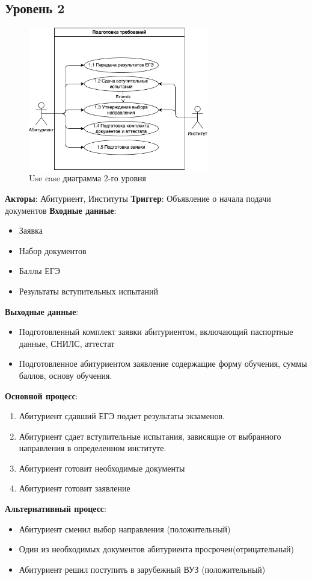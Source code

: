 \documentclass[areasetadvanced]{scrartcl}
\begin{document}
\subsection{Уровень 2}
\begin{figure}[H]
    \centering
    \includegraphics[width=0.7\textwidth]{images/UseCase_2.drawio.png}
    \caption{Use case диаграмма 2-го уровня}
    \label{fig:syntdiag}
\end{figure}
\textbf{Акторы}: Абитуриент, Институты
\textbf{Триггер}: Объявление о начала подачи документов
\textbf{Входные данные}:
\begin{itemize}
    \item Заявка
    \item Набор документов
    \item Баллы ЕГЭ
    \item Результаты вступительных испытаний
\end{itemize}
\textbf{Выходные данные}:
\begin{itemize}
    \item Подготовленный комплект заявки абитуриентом, включающий паспортные данные, СНИЛС, аттестат
    \item Подготовленное абитуриентом заявление содержащие форму обучения, суммы баллов, основу обучения.
\end{itemize}
\textbf{Основной процесс}:
\begin{enumerate}
    \item Абитуриент сдавший ЕГЭ подает результаты экзаменов.
    \item Абитуриент сдает вступительные испытания, зависящие от выбранного направления в определенном институте.
    \item Абитуриент готовит необходимые документы
    \item Абитуриент готовит заявление
\end{enumerate}
\textbf{Альтернативный процесс}:
\begin{itemize}
    \item Абитуриент сменил выбор направления (положительный)
    \item Один из необходимых документов абитуриента просрочен(отрицательный)
    \item Абитуриент решил поступить в зарубежный ВУЗ (положительный)
\end{itemize}
\newpage
\end{document}
